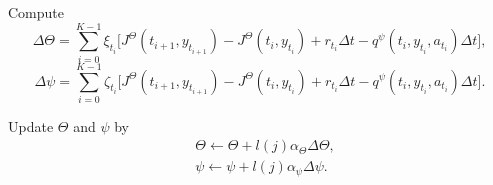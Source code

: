 \documentclass[11pt]{article}
\begin{document}
\begin{algorithm}[hbtp]
\begin{algorithmic}
{Compute  %
\[ \Delta \Theta = \sum_{i=0}^{K-1} \xi_{t_i} \big[ J^{\Theta}(t_{i+1}, y_{t_{i+1}}) - J^{\Theta}(t_{i},y_{t_{i}}) + r_{t_i}\Delta t -q^{\psi}(t_{i}, y_{t_{i}},a_{t_i})\Delta t  \big], \]
\[
\Delta \psi =   \sum_{i=0}^{K-1}\zeta_{t_i}\big[ J^{\Theta}(t_{i+1},y_{t_{i+1}}) - J^{\Theta}(t_{i}, y_{t_{i}}) + r_{t_i}\Delta t - q^{\psi}(t_{i},y_{t_{i}},a_{t_i})\Delta t \big] .
\]

Update $\Theta$ and $\psi$ by
\begin{align}
 &\Theta \leftarrow \Theta + l(j)\alpha_{\Theta} \Delta \Theta , \label{Theta-update}\\
& \psi \leftarrow \psi + l(j)\alpha_{\psi} \Delta \psi .  \label{Delta-update}
\end{align}

}
\ENDFOR
\end{algorithmic}
\label{algo:offline episodic}
\end{algorithm}
\end{document}
